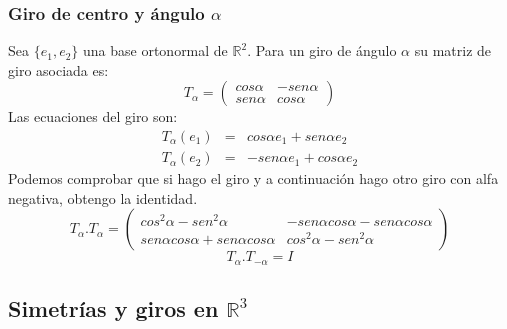 \documentclass [a4paper,12pt]{article}
\begin{document}
\subsubsection{Giro de centro y ángulo $\alpha$}
Sea $\{e_1,e_2\}$ una base ortonormal de $ \mathbb{R}^2$. Para un giro de ángulo 
$\alpha$ su matriz de giro asociada es:
$$
T_\alpha=\begin{pmatrix}
cos\alpha&-sen\alpha\\
sen\alpha&cos\alpha
\end{pmatrix}
$$
Las ecuaciones del giro son:
\begin{eqnarray}
T_\alpha (e_1)& = & cos\alpha  e_1 + sen\alpha  e_2 \\
T_\alpha (e_2)& = & -sen\alpha  e_1 + cos\alpha  e_2
\end{eqnarray}
Podemos comprobar que si hago el giro y a continuación hago otro giro con alfa negativa, obtengo la identidad.
$$
T_\alpha .T_{\alpha}=\begin{pmatrix}
cos^2\alpha-sen^2\alpha&-sen\alpha cos\alpha - sen\alpha cos\alpha \\
sen\alpha cos\alpha+sen\alpha cos\alpha&cos^2\alpha-sen^2\alpha
\end{pmatrix}
$$
$$
T_\alpha .T_{-\alpha}=I
$$
\subsection{Simetrías y giros en  $\mathbb{R}^3$}
\end{document}
